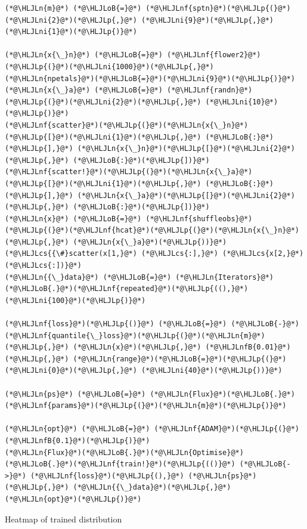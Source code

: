 \documentclass[12pt,a4paper]{article}
\newcommand{\HLJLn}[1]{#1}
\newcommand{\HLJLnf}[1]{\textcolor[RGB]{66,102,213}{#1}}
\newcommand{\HLJLnfB}[1]{\textcolor[RGB]{59,151,46}{#1}}
\newcommand{\HLJLni}[1]{\textcolor[RGB]{59,151,46}{#1}}
\newcommand{\HLJLoB}[1]{\textcolor[RGB]{102,102,102}{\textbf{#1}}}
\newcommand{\HLJLp}[1]{#1}
\newcommand{\HLJLcs}[1]{\textcolor[RGB]{153,153,119}{\textit{#1}}}
\begin{document}
\begin{lstlisting}
(*@\HLJLn{m}@*) (*@\HLJLoB{=}@*) (*@\HLJLnf{sptn}@*)(*@\HLJLp{(}@*)(*@\HLJLni{2}@*)(*@\HLJLp{,}@*) (*@\HLJLni{9}@*)(*@\HLJLp{,}@*) (*@\HLJLni{1}@*)(*@\HLJLp{)}@*)

(*@\HLJLn{x{\_}n}@*) (*@\HLJLoB{=}@*) (*@\HLJLnf{flower2}@*)(*@\HLJLp{(}@*)(*@\HLJLni{1000}@*)(*@\HLJLp{,}@*) (*@\HLJLn{npetals}@*)(*@\HLJLoB{=}@*)(*@\HLJLni{9}@*)(*@\HLJLp{)}@*)
(*@\HLJLn{x{\_}a}@*) (*@\HLJLoB{=}@*) (*@\HLJLnf{randn}@*)(*@\HLJLp{(}@*)(*@\HLJLni{2}@*)(*@\HLJLp{,}@*) (*@\HLJLni{10}@*)(*@\HLJLp{)}@*)
(*@\HLJLnf{scatter}@*)(*@\HLJLp{(}@*)(*@\HLJLn{x{\_}n}@*)(*@\HLJLp{[}@*)(*@\HLJLni{1}@*)(*@\HLJLp{,}@*) (*@\HLJLoB{:}@*)(*@\HLJLp{],}@*) (*@\HLJLn{x{\_}n}@*)(*@\HLJLp{[}@*)(*@\HLJLni{2}@*)(*@\HLJLp{,}@*) (*@\HLJLoB{:}@*)(*@\HLJLp{])}@*)
(*@\HLJLnf{scatter!}@*)(*@\HLJLp{(}@*)(*@\HLJLn{x{\_}a}@*)(*@\HLJLp{[}@*)(*@\HLJLni{1}@*)(*@\HLJLp{,}@*) (*@\HLJLoB{:}@*)(*@\HLJLp{],}@*) (*@\HLJLn{x{\_}a}@*)(*@\HLJLp{[}@*)(*@\HLJLni{2}@*)(*@\HLJLp{,}@*) (*@\HLJLoB{:}@*)(*@\HLJLp{])}@*)
(*@\HLJLn{x}@*) (*@\HLJLoB{=}@*) (*@\HLJLnf{shuffleobs}@*)(*@\HLJLp{(}@*)(*@\HLJLnf{hcat}@*)(*@\HLJLp{(}@*)(*@\HLJLn{x{\_}n}@*)(*@\HLJLp{,}@*) (*@\HLJLn{x{\_}a}@*)(*@\HLJLp{))}@*)
(*@\HLJLcs{{\#}scatter(x[1,}@*) (*@\HLJLcs{:],}@*) (*@\HLJLcs{x[2,}@*) (*@\HLJLcs{:])}@*)
(*@\HLJLn{{\_}data}@*) (*@\HLJLoB{=}@*) (*@\HLJLn{Iterators}@*)(*@\HLJLoB{.}@*)(*@\HLJLnf{repeated}@*)(*@\HLJLp{((),}@*) (*@\HLJLni{100}@*)(*@\HLJLp{)}@*)

(*@\HLJLnf{loss}@*)(*@\HLJLp{()}@*) (*@\HLJLoB{=}@*) (*@\HLJLoB{-}@*)(*@\HLJLnf{quantile{\_}loss}@*)(*@\HLJLp{(}@*)(*@\HLJLn{m}@*)(*@\HLJLp{,}@*) (*@\HLJLn{x}@*)(*@\HLJLp{,}@*) (*@\HLJLnfB{0.01}@*)(*@\HLJLp{,}@*) (*@\HLJLn{range}@*)(*@\HLJLoB{=}@*)(*@\HLJLp{(}@*)(*@\HLJLni{0}@*)(*@\HLJLp{,}@*) (*@\HLJLni{40}@*)(*@\HLJLp{))}@*)

(*@\HLJLn{ps}@*) (*@\HLJLoB{=}@*) (*@\HLJLn{Flux}@*)(*@\HLJLoB{.}@*)(*@\HLJLnf{params}@*)(*@\HLJLp{(}@*)(*@\HLJLn{m}@*)(*@\HLJLp{)}@*)

(*@\HLJLn{opt}@*) (*@\HLJLoB{=}@*) (*@\HLJLnf{ADAM}@*)(*@\HLJLp{(}@*)(*@\HLJLnfB{0.1}@*)(*@\HLJLp{)}@*)
(*@\HLJLn{Flux}@*)(*@\HLJLoB{.}@*)(*@\HLJLn{Optimise}@*)(*@\HLJLoB{.}@*)(*@\HLJLnf{train!}@*)(*@\HLJLp{(()}@*) (*@\HLJLoB{->}@*) (*@\HLJLnf{loss}@*)(*@\HLJLp{(),}@*) (*@\HLJLn{ps}@*)(*@\HLJLp{,}@*) (*@\HLJLn{{\_}data}@*)(*@\HLJLp{,}@*) (*@\HLJLn{opt}@*)(*@\HLJLp{)}@*)
\end{lstlisting}


Heatmap of trained distribution
\end{document}
